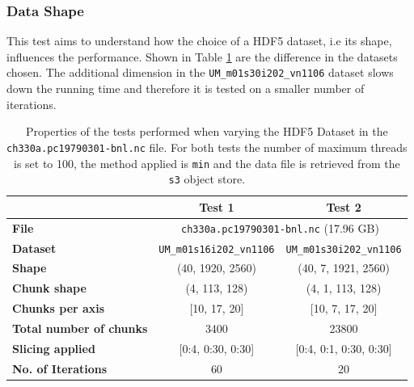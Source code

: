 \documentclass{article}
\begin{document}
\subsubsection{Data Shape}
This test aims to understand how the choice of a HDF5 dataset, i.e its shape, influences the performance. Shown in Table \ref{tab:T1T2_Conditions} are the difference in the datasets chosen. The additional dimension in the \texttt{UM\_m01s30i202\_vn1106} dataset slows down the running time and therefore it is tested on a smaller number of iterations. 
\begin{table}[h!] 
    \centering 
    \begin{tabular}{lcc}  \hline
                                        & Test 1                            & Test 2                              \\ \hline
        \textbf{File}                   & \multicolumn{2}{c}{ \texttt{ch330a.pc19790301-bnl.nc}  (17.96  GB)}     \\                                       
        \textbf{Dataset}                &\texttt{UM\_m01s16i202\_vn1106}    & \texttt{UM\_m01s30i202\_vn1106}     \\ 
        \textbf{Shape}                  & (40, 1920, 2560)                  & (40, 7, 1921, 2560)                 \\ 
        \textbf{Chunk shape}            & (4, 113, 128)                     & (4, 1, 113, 128)                    \\ 
        \textbf{Chunks per axis}        & [10, 17, 20]                      & [10, 7, 17, 20]                     \\ 
        \textbf{Total number of chunks} & 3400                              &   23800                             \\ 
        \textbf{Slicing applied}        & [0:4, 0:30, 0:30]                 &[0:4, 0:1, 0:30, 0:30]               \\ 
        \textbf{No. of Iterations}      & 60                                & 20                                  \\  \hline
    \end{tabular} 
    \caption{Properties of the tests performed when varying the HDF5 Dataset in the \texttt{ch330a.pc19790301-bnl.nc} file. For both tests the number of maximum threads is set to 100, the method applied is \texttt{min} and the data file is retrieved from the \texttt{s3} object store.} 
    \label{tab:T1T2_Conditions} 
\end{table}
\end{document}
